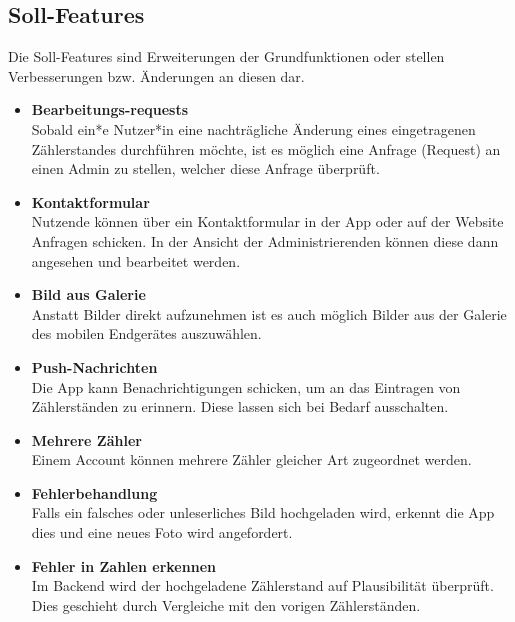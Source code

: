 \subsection{Soll-Features}
Die Soll-Features sind Erweiterungen der Grundfunktionen oder stellen Verbesserungen bzw. Änderungen an diesen dar.
\begin{itemize}
\item \textbf{Bearbeitungs-requests} \hfill \\
Sobald ein*e Nutzer*in eine nachträgliche Änderung eines eingetragenen 
Zählerstandes durchführen möchte, ist es möglich eine Anfrage (Request) an einen Admin zu stellen, welcher diese Anfrage
überprüft.
\item \textbf{Kontaktformular} \hfill \\
	Nutzende können über ein Kontaktformular in der App oder auf der Website Anfragen schicken.
	In der Ansicht der Administrierenden können diese dann angesehen und bearbeitet werden. 
\item \textbf{Bild aus Galerie} \hfill \\
	Anstatt Bilder direkt aufzunehmen ist es auch möglich Bilder aus der Galerie des mobilen Endgerätes auszuwählen.
\item \textbf{Push-Nachrichten} \hfill \\
	Die App kann Benachrichtigungen schicken, um an das Eintragen von Zählerständen zu erinnern.
	Diese lassen sich bei Bedarf ausschalten.
\item \textbf{Mehrere Zähler}\hfill \\
	Einem Account können mehrere Zähler gleicher Art zugeordnet werden.
\item \textbf{Fehlerbehandlung} \hfill \\
	Falls ein falsches oder unleserliches Bild hochgeladen wird, erkennt die App dies und eine neues Foto wird angefordert.
\item \textbf{Fehler in Zahlen erkennen} \hfill \\
	Im Backend wird der hochgeladene Zählerstand auf Plausibilität überprüft. Dies geschieht durch Vergleiche mit den vorigen Zählerständen.
\end{itemize}

